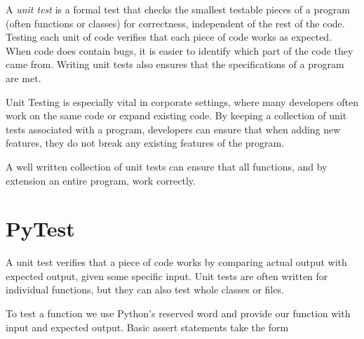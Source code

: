 


A \emph{unit test} is a formal test that checks the smallest testable pieces of a program (often functions or classes) for correctness, independent of the rest of the code.
Testing each unit of code verifies that each piece of code works as expected.
When code does contain bugs, it is easier to identify which part of the code they came from.
Writing unit tests also ensures that the specifications of a program are met.

Unit Testing is especially vital in corporate settings, where many developers often work on the same code or expand existing code.
By keeping a collection of unit tests associated with a program, developers can ensure that when adding new features, they do not break any existing features of the program.

A well written collection of unit tests can ensure that all functions, and by extension an entire program, work correctly.

\section*{PyTest} %

A unit test verifies that a piece of code works by comparing actual output with expected output, given some specific input.
Unit tests are often written for individual functions, but they can also test whole classes or files.

To test a function we use Python's reserved word  and provide our function with input and expected output. Basic assert statements take the form

